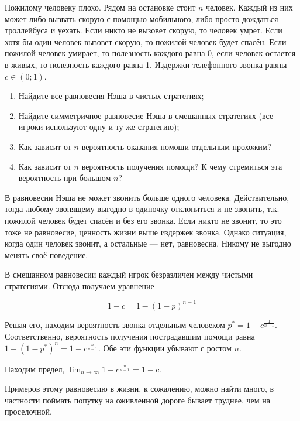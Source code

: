\begin{problem}
Пожилому человеку плохо. Рядом на остановке стоит $n$  человек. Каждый из них может либо вызвать скорую с помощью мобильного, либо просто дождаться троллейбуса и уехать. Если никто не вызовет скорую, то человек умрет. Если хотя бы один человек вызовет скорую, то пожилой человек будет спасён. Если пожилой человек умирает, то полезность каждого равна 0, если человек остается в живых, то полезность каждого равна 1. Издержки телефонного звонка равны  $c\in \left(0;1\right)$.
\begin{enumerate}
\item  Найдите все равновесия Нэша в чистых стратегиях;
\item  Найдите симметричное равновесие Нэша в смешанных стратегиях (все игроки используют одну и ту же стратегию);
\item  Как зависит от  $n$  вероятность оказания помощи отдельным прохожим?
\item Как зависит от  $n$  вероятность получения помощи? К чему стремиться эта вероятность при большом $n$?
\end{enumerate}


\begin{sol}
В равновесии Нэша не может звонить больше одного человека. Действительно, тогда любому звонящему выгодно в одиночку отклониться и не звонить, т.к. пожилой человек будет спасён и без его звонка. Если никто не звонит, то это тоже не равновесие, ценность жизни выше издержек звонка. Однако ситуация, когда один человек звонит, а остальные --- нет, равновесна. Никому не выгодно менять своё поведение.

В смешанном равновесии каждый игрок безразличен между чистыми стратегиями. Отсюда получаем уравнение

\[
1-c=1-(1-p)^{n-1}
\]

Решая его, находим вероятность звонка отдельным человеком $p^*=1-c^{\frac{1}{n-1}}$. Соответственно, вероятность получения пострадавшим помощи равна $1-(1-p^*)^n=1-c^{\frac{n}{n-1}}$. Обе эти функции убывают с ростом $n$.

Находим предел, $\lim_{n\to\infty} 1-c^{\frac{n}{n-1}} = 1-c$.

Примеров этому равновесию в жизни, к сожалению, можно найти много, в частности поймать попутку на оживленной дороге бывает труднее, чем на проселочной.

\end{sol}
\end{problem}

